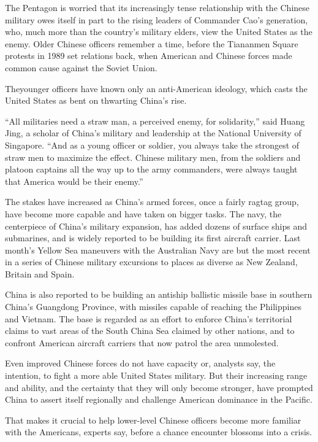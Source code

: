 ﻿\documentclass[12pt]{article}
\begin{document}
The Pentagon is worried that its increasingly tense relationship with the Chinese military owes
itself in part to the rising leaders of Commander Cao's generation, who, much more than the
country's military elders, view the United States as the enemy. Older Chinese officers remember a
time, before the Tiananmen Square protests in 1989 set relations back, when American and Chinese
forces made common cause against the Soviet Union.

Theyounger officers have known only an anti-American ideology, which casts the United States as bent
on thwarting China's rise.

``All militaries need a straw man, a perceived enemy, for solidarity,'' said Huang Jing, a scholar
of China's military and leadership at the National University of Singapore. ``And as a young officer
or soldier, you always take the strongest of straw men to maximize the effect. Chinese military men,
from the soldiers and platoon captains all the way up to the army commanders, were always taught
that America would be their enemy.''

The stakes have increased as China's armed forces, once a fairly ragtag group, have become more
capable and have taken on bigger tasks. The navy, the centerpiece of China's military expansion, has
added dozens of surface ships and submarines, and is widely reported to be building its first
aircraft carrier. Last month's Yellow Sea maneuvers with the Australian Navy are but the most recent
in a series of Chinese military excursions to places as diverse as New Zealand, Britain and Spain.

China is also reported to be building an antiship ballistic missile base in southern China's
Guangdong Province, with missiles capable of reaching the Philippines and Vietnam. The base is
regarded as an effort to enforce China's territorial claims to vast areas of the South China Sea
claimed by other nations, and to confront American aircraft carriers that now patrol the area
unmolested.

Even improved Chinese forces do not have capacity or, analysts say, the intention, to fight a more
able United States military. But their increasing range and ability, and the certainty that they
will only become stronger, have prompted China to assert itself regionally and challenge American
dominance in the Pacific.

That makes it crucial to help lower-level Chinese officers become more familiar with the Americans,
experts say, before a chance encounter blossoms into a crisis.
\end{document}
